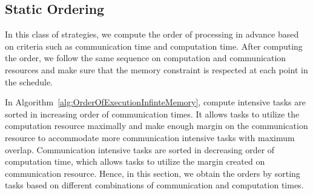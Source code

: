 \documentclass[sigconf]{acmart}
\begin{document}
	\subsection{Static Ordering}
	In this class of strategies, we compute the order of processing in advance based on criteria such as communication time and computation time. After computing the order, we follow the same sequence on computation and communication resources and make sure that the memory constraint is respected at each point in the schedule.
	
	In Algorithm~\ref{alg:OrderOfExecutionInfinteMemory}, compute intensive tasks are sorted in increasing order of communication times. It allows tasks to utilize the computation resource maximally and make enough margin on the communication resource to accommodate more communication intensive tasks with maximum overlap. Communication intensive tasks are sorted in decreasing order of computation time, which allows tasks to utilize the margin created on communication resource. Hence, in this section, we obtain the orders by sorting tasks based on different combinations of communication and computation times.
\end{document}
